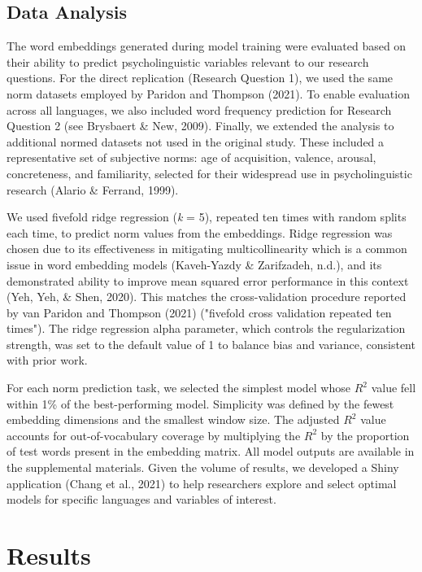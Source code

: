 \documentclass[
  english,
  man,floatsintext]{apa6}
\begin{document}
\subsection{Data Analysis}\label{data-analysis}

The word embeddings generated during model training were evaluated based on their ability to predict psycholinguistic variables relevant to our research questions. For the direct replication (Research Question 1), we used the same norm datasets employed by Paridon and Thompson (2021). To enable evaluation across all languages, we also included word frequency prediction for Research Question 2 (see Brysbaert \& New, 2009). Finally, we extended the analysis to additional normed datasets not used in the original study. These included a representative set of subjective norms: age of acquisition, valence, arousal, concreteness, and familiarity, selected for their widespread use in psycholinguistic research (Alario \& Ferrand, 1999).

We used fivefold ridge regression (\emph{k} = 5), repeated ten times with random splits each time, to predict norm values from the embeddings. Ridge regression was chosen due to its effectiveness in mitigating multicollinearity which is a common issue in word embedding models (Kaveh-Yazdy \& Zarifzadeh, n.d.), and its demonstrated ability to improve mean squared error performance in this context (Yeh, Yeh, \& Shen, 2020). This matches the cross-validation procedure reported by van Paridon and Thompson (2021) ("fivefold cross validation repeated ten times"). The ridge regression alpha parameter, which controls the regularization strength, was set to the default value of 1 to balance bias and variance, consistent with prior work.

For each norm prediction task, we selected the simplest model whose \(R^2\) value fell within 1\% of the best-performing model. Simplicity was defined by the fewest embedding dimensions and the smallest window size. The adjusted \(R^2\) value accounts for out-of-vocabulary coverage by multiplying the \(R^2\) by the proportion of test words present in the embedding matrix. All model outputs are available in the supplemental materials. Given the volume of results, we developed a Shiny application (Chang et al., 2021) to help researchers explore and select optimal models for specific languages and variables of interest.

\section{Results}\label{results}
\end{document}
